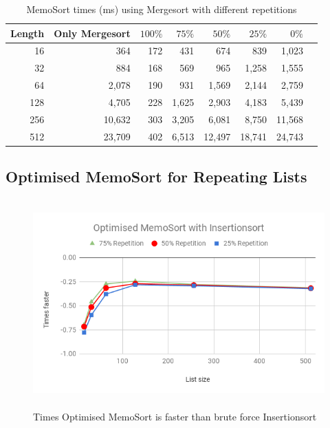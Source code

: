 \documentclass[a4paper,12pt]{article}
\begin{document}
\begin{table}[H]
\centering
\begin{tabular}{|r|r|r|r|r|r|r|r|}   \hline
	{Length} & {Only Mergesort} & {$100\%$} & {$75\%$} & {$50\%$} & {$25\%$} & {$0\%$} \\  \hline
	16 &364&172&431 & 674 & 839 & 1,023\\ 
	32 &884&168&569 & 965& 1,258& 1,555\\ 
	64 &2,078&190 &931&1,569&2,144&2,759\\ 
	128 &4,705&228&1,625&2,903&4,183&5,439\\ 
	256 &10,632&303&3,205&6,081&8,750&11,568\\ 
	512 &23,709& 402&6,513&12,497&18,741&24,743\\  \hline
\end{tabular}
\caption{MemoSort times (ms) using Mergesort with different repetitions}
\label{fig:MemoSortMergeTable}
\end{table}

\subsection{Optimised MemoSort for Repeating Lists}

\begin{figure}[H]
    \centering
    \includegraphics[height=8cm,keepaspectratio]{./images/OptMemoSortIns.png}
    \caption{Times Optimised MemoSort is faster than brute force Insertionsort}
    \label{fig:OptMemoSortInsGraph}
\end{figure}
\end{document}
